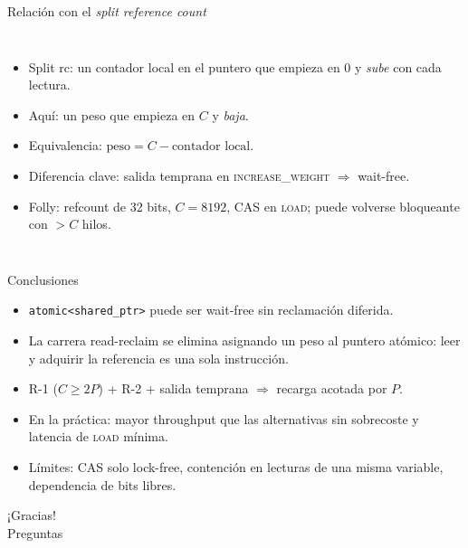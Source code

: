 \documentclass[aspectratio=169,11pt,xcolor=table]{beamer}
\begin{document}
\begin{frame}{Relación con el \emph{split reference count}}
  \begin{columns}[c]
    \begin{itemize}
      \item Split rc: un \alert{contador local} en el puntero que empieza en 0 y \emph{sube} con cada lectura.
      \item Aquí: un \alert{peso} que empieza en $C$ y \emph{baja}.
      \item Equivalencia: $\text{peso} = C - \text{contador local}$.
      \item Diferencia clave: \alert{salida temprana} en \textsc{increase\_weight} $\Rightarrow$ wait-free.
      \item Folly: refcount de 32 bits, $C=8192$, CAS en \textsc{load}; puede volverse bloqueante con $>C$ hilos.
    \end{itemize}
    \centering
  \end{columns}
\end{frame}

\begin{frame}{Conclusiones}
  \begin{itemize}
    \item \texttt{atomic<shared\_ptr>} puede ser \alert{wait-free sin reclamación diferida}.
    \item La carrera read-reclaim se elimina asignando un \alert{peso} al puntero atómico: leer y adquirir la referencia es una sola instrucción.
    \item R-1 ($C\geq2P$) + R-2 + salida temprana $\Rightarrow$ recarga acotada por $P$.
    \item En la práctica: \alert{mayor throughput} que las alternativas sin sobrecoste y \alert{latencia de \textsc{load} mínima}.
    \item Límites: CAS solo lock-free, contención en lecturas de una misma variable, dependencia de bits libres.
  \end{itemize}
  \vspace{3mm}
\end{frame}

\begin{frame}[plain]
  \centering
  \vspace*{20mm}
  {\Huge\color{azul} ¡Gracias!}\\[6mm]
  {\large Preguntas}
\end{frame}
\end{document}
